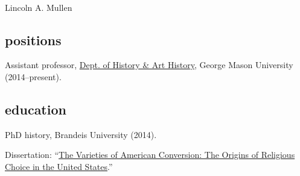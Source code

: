 \documentclass[11pt]{article}
\begin{document}
\thispagestyle{fancy}
\fancyfoot{}
\fancyhead{}
\renewcommand{\headrulewidth}{0pt}

\hfill\hfill\hfill
\hfill\hfill\hfill
\hfill\hfill\hfill
\hfill\hfill\hfill
\begin{minipage}[t]{1.4in}
   \\
\end{minipage}
\hfill
\begin{minipage}[t]{1.9in}
\end{minipage}

\vspace{0.1in}

{\Large Lincoln A. Mullen}\\[-0.1in]

\subsection{positions}\label{appointment}

Assistant professor, \href{http://historyarthistory.gmu.edu/}{Dept.
  of History \& Art History}, George Mason University (2014--present).

\subsection{education}\label{education}

PhD history, Brandeis University (2014). 

\hfill\begin{minipage}{6.25in}

  Dissertation: ``\href{/research/\#dissertation}{The Varieties of American 
    Conversion: The Origins of Religious Choice in the United States}.'' 

\end{minipage}

\vspace{0.05in}
\end{document}
